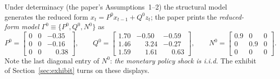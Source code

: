 \documentclass[11pt]{article}
\theoremstyle{remark}
\begin{document}
Under determinacy (the paper's Assumptions~1--2) the structural model generates the reduced form $x_t=P^0x_{t-1}+Q^0z_t$; the paper prints the \emph{reduced-form model} $\Gamma^0\equiv\{P^0,Q^0,N^0\}$ as
\begin{equation}\label{eq:printed}
P^0=\begin{bmatrix} 0 & 0 & -0.35\\
0 & 0 & -0.16\\
0 & 0 & \phantom{-}0.38
\end{bmatrix},
\qquad Q^0=\begin{bmatrix} 1.70 & -0.50 & -0.59\\
1.46 & \phantom{-}3.24 & -0.27\\
1.59 & \phantom{-}1.61 & \phantom{-}0.63
\end{bmatrix},
\qquad N^0=\begin{bmatrix} 0.9 & 0 & 0\\
0 & 0.9 & 0\\
0 & 0 & 0
\end{bmatrix} .
\end{equation}
Note the last diagonal entry of $N^0$: \emph{the monetary policy shock is i.i.d.} The exhibit of Section~\ref{sec:exhibit} turns on these displays.
\end{document}
